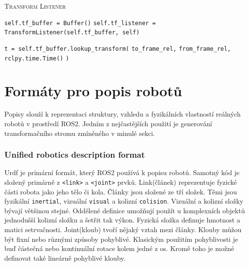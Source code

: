 \begin{algorithm}[h!]
	\label{}
	\caption{\textsc{Transform Listener}}
	
	\DontPrintSemicolon
	\SetAlgoNoLine
	\SetNlSty{}{}{:}
	\SetNlSkip{-1.1em}
	
	\BlankLine \Indp\Indpp
	
	\texttt{self.tf\_buffer = Buffer()}\;
	\texttt{self.tf\_listener = TransformListener(self.tf\_buffer, self)}\;

	\BlankLine
	\texttt{t = self.tf\_buffer.lookup\_transform(}\;
	\Indp\Indp
	\texttt{to\_frame\_rel,}\;
	\texttt{from\_frame\_rel,}\;
	\texttt{rclpy.time.Time()}\;
	\Indm\Indm
	\texttt{)}\;
	
\end{algorithm}

\section{Formáty pro popis robotů}
Popisy slouží k reprezentaci struktury, vzhledu a fyzikálních vlastností reálných robotů v prostředí ROS2. Jedním z nejčastějších použití je generování transformačního stromu zmíněného v minulé sekci.

\subsubsection*{Unified robotics description format}
Urdf je primární formát, který ROS2 používá k popisu robotů. Samotný kód je složený primárně z \verb|<link>| a \verb|<joint>| prvků. Link(článek) reprezentuje fyzické části robota jako jeho tělo či kola. Články jsou složené ze tří složek. Těmi jsou fyzikální \verb|inertial|, vizuální \verb|visual| a kolizní \verb|colision|. Vizuální a kolizní složky bývají většinou stejné. Oddělené definice umožňují použít u komplexních objektů jednodušší kolizní složku a šetřit tak výkon. Fyzická složka definuje hmotnost a matici setrvačnosti. Joint(kloub) tvoří nějaký vztah mezi články. Klouby můžou být fixní nebo různými způsoby pohyblivé. Klasickým použitím pohyblivosti je buď částečná nebo kontinuální rotace kolem jedné z os. Kromě toho je možné definovat také lineárně pohyblivé klouby. \cite{ros2_documentation} 

